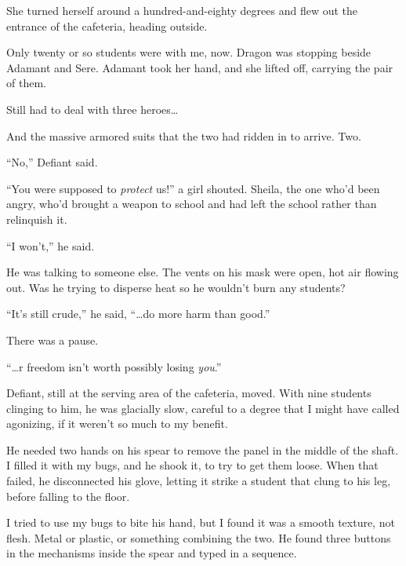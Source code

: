 She turned herself around a hundred-and-eighty degrees and flew out the entrance of the cafeteria, heading outside.



Only twenty or so students were with me, now.  Dragon was stopping beside Adamant and Sere.  Adamant took her hand, and she lifted off, carrying the pair of them.



Still had to deal with three heroes\ldots



And the massive armored suits that the two had ridden in to arrive.  Two.



``No,'' Defiant said.



``You were supposed to \emph{protect} us!'' a girl shouted.  Sheila, the one who'd been angry, who'd brought a weapon to school and had left the school rather than relinquish it.



``I won't,'' he said.



He was talking to someone else.  The vents on his mask were open, hot air flowing out.  Was he trying to disperse heat so he wouldn't burn any students?



``It's still crude,'' he said, ``\ldots do more harm than good.''



There was a pause.



``\ldots{}r freedom isn't worth possibly losing \emph{you}.''



Defiant, still at the serving area of the cafeteria, moved.  With nine students clinging to him, he was glacially slow, careful to a degree that I might have called agonizing, if it weren't so much to my benefit.



He needed two hands on his spear to remove the panel in the middle of the shaft.  I filled it with my bugs, and he shook it, to try to get them loose.  When that failed, he disconnected his glove, letting it strike a student that clung to his leg, before falling to the floor.



I tried to use my bugs to bite his hand, but I found it was a smooth texture, not flesh.  Metal or plastic, or something combining the two.  He found three buttons in the mechanisms inside the spear and typed in a sequence.



